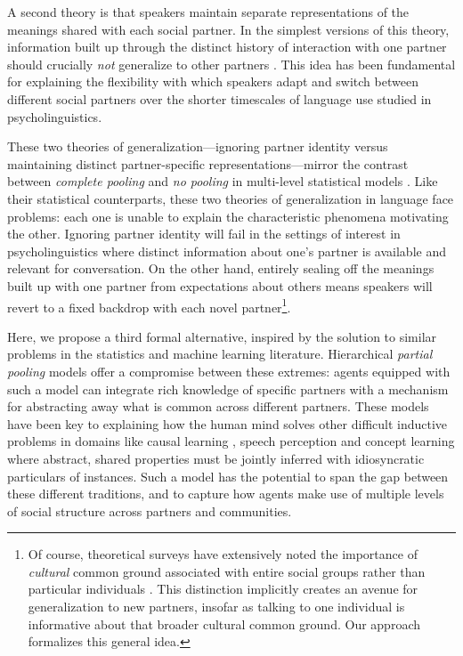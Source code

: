 A second theory is that speakers maintain separate representations of the meanings shared with each social partner. 
In the simplest versions of this theory, information built up through the distinct history of interaction with one partner should crucially \emph{not} generalize to other partners \cite{clark_using_1996,brennan_partner-specific_2009,horton_revisiting_2016}.
This idea has been fundamental for explaining the flexibility with which speakers adapt and switch between different social partners \cite{wilkes-gibbs_coordinating_1992,metzing_when_2003} over the shorter timescales of language use studied in psycholinguistics.

These two theories of generalization---ignoring partner identity versus maintaining distinct partner-specific representations---mirror the contrast between \emph{complete pooling} and \emph{no pooling} in multi-level statistical models \cite{gelman2006data}. 
Like their statistical counterparts, these two theories of generalization in language face problems: each one is unable to explain the characteristic phenomena motivating the other. 
Ignoring partner identity will fail in the settings of interest in psycholinguistics where distinct information about one’s partner is available and relevant for conversation. 
On the other hand, entirely sealing off the meanings built up with one partner from expectations about others means speakers will revert to a fixed backdrop with each novel partner\footnote{Of course, theoretical surveys have extensively noted the importance of \emph{cultural} common ground associated with entire social groups rather than particular individuals \cite[e.g.]{Clark98_CommunalLexicons}. This distinction implicitly creates an avenue for generalization to new partners, insofar as talking to one individual is informative about that broader cultural common ground. Our approach formalizes this general idea.}.

Here, we propose a third formal alternative, inspired by the solution to similar problems in the statistics and machine learning literature.
Hierarchical \emph{partial pooling} models offer a compromise between these extremes: agents equipped with such a model can integrate rich knowledge of specific partners with a mechanism for abstracting away what is common across different partners.
These models have been key to explaining how the human mind solves other difficult inductive problems in domains like causal learning \cite{KempGoodmanTenenbaum10_LearningToLearn,GoodmanUllmanTenenbaum11_TheoryOfCausality}, speech perception \cite{KleinschmidtJaeger15_RobustSpeechPerception} and concept learning \cite{KempPerforsTenenbaum07_HBM} where abstract, shared properties must be jointly inferred with idiosyncratic particulars of instances. 
Such a model has the potential to span the gap between these different traditions, and to capture how agents make use of multiple levels of social structure across partners and communities. 

